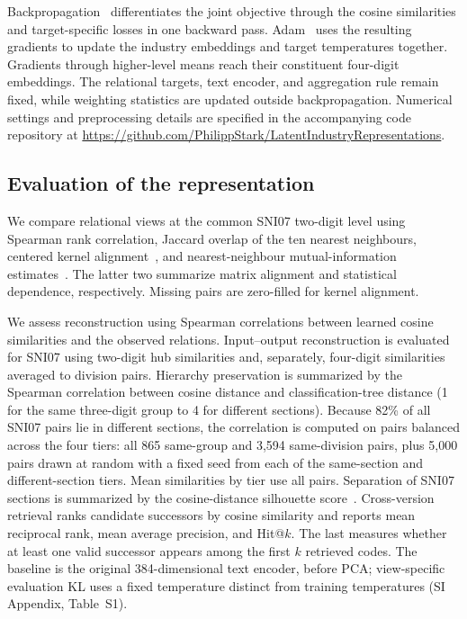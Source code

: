 \documentclass[9pt,twocolumn,twoside]{pnas-new}
\begin{document}
Backpropagation~\cite{rumelhartLearningRepresentationsBackpropagating1986} differentiates the joint objective through the cosine similarities and target-specific losses in one backward pass. Adam~\cite{kingmaAdamMethodStochastic2014} uses the resulting gradients to update the industry embeddings and target temperatures together. Gradients through higher-level means reach their constituent four-digit embeddings. The relational targets, text encoder, and aggregation rule remain fixed, while weighting statistics are updated outside backpropagation. Numerical settings and preprocessing details are specified in the accompanying code repository at \url{https://github.com/PhilippStark/LatentIndustryRepresentations}.

\subsection{Evaluation of the representation}
\label{subsec:embedding-evaluation}

We compare relational views at the common SNI07 two-digit level using Spearman rank correlation, Jaccard overlap of the ten nearest neighbours, centered kernel alignment~\cite{cortesAlgorithmsLearningKernels2012}, and nearest-neighbour mutual-information estimates~\cite{kraskovEstimatingMutualInformation2004}. The latter two summarize matrix alignment and statistical dependence, respectively. Missing pairs are zero-filled for kernel alignment.

We assess reconstruction using Spearman correlations between learned cosine similarities and the observed relations. Input--output reconstruction is evaluated for SNI07 using two-digit hub similarities and, separately, four-digit similarities averaged to division pairs. Hierarchy preservation is summarized by the Spearman correlation between cosine distance and classification-tree distance (1 for the same three-digit group to 4 for different sections). Because 82\% of all SNI07 pairs lie in different sections, the correlation is computed on pairs balanced across the four tiers: all 865 same-group and 3,594 same-division pairs, plus 5,000 pairs drawn at random with a fixed seed from each of the same-section and different-section tiers. Mean similarities by tier use all pairs. Separation of SNI07 sections is summarized by the cosine-distance silhouette score~\cite{rousseeuwSilhouettesGraphicalAid1987}. Cross-version retrieval ranks candidate successors by cosine similarity and reports mean reciprocal rank, mean average precision, and Hit@$k$. The last measures whether at least one valid successor appears among the first $k$ retrieved codes. The baseline is the original 384-dimensional text encoder, before PCA; view-specific evaluation KL uses a fixed temperature distinct from training temperatures (SI Appendix, Table~S1).
\end{document}
